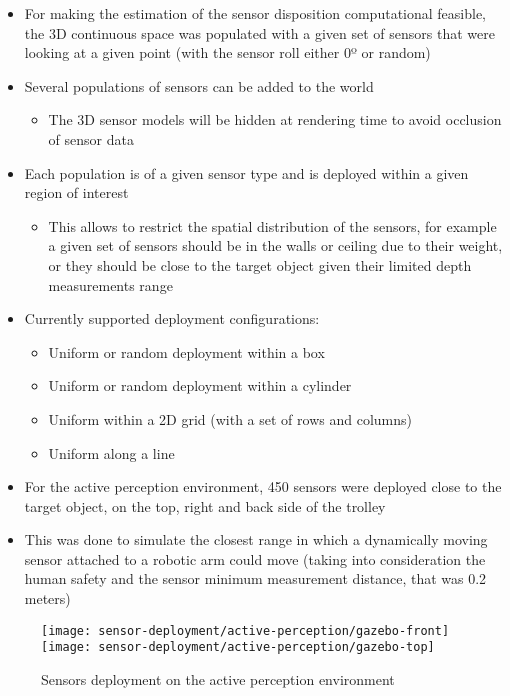 \begin{itemize}
	\item For making the estimation of the sensor disposition computational feasible, the 3D continuous space was populated with a given set of sensors that were looking at a given point (with the sensor roll either 0º or random)
	\item Several populations of sensors can be added to the world
	\begin{itemize}
		\item The 3D sensor models will be hidden at rendering time to avoid occlusion of sensor data
	\end{itemize}
	\item Each population is of a given sensor type and is deployed within a given region of interest 
	\begin{itemize}
		\item This allows to restrict the spatial distribution of the sensors, for example a given set of sensors should be in the walls or ceiling due to their weight, or they should be close to the target object given their limited depth measurements range
	\end{itemize}
	\item Currently supported deployment configurations:
	\begin{itemize}
		\item Uniform or random deployment within a box
		\item Uniform or random deployment within a cylinder
		\item Uniform within a 2D grid (with a set of rows and columns)
		\item Uniform along a line
	\end{itemize}
\end{itemize}

\begin{itemize}
	\item For the active perception environment, 450 sensors were deployed close to the target object, on the top, right and back side of the trolley
	\item This was done to simulate the closest range in which a dynamically moving sensor attached to a robotic arm could move (taking into consideration the human safety and the sensor minimum measurement distance, that was 0.2 meters)
\end{itemize}
\begin{figure}
	\centering
	\texttt{[image: sensor-deployment/active-perception/gazebo-front]}\hspace{1em}
	\texttt{[image: sensor-deployment/active-perception/gazebo-top]}
	\caption{Sensors deployment on the active perception environment}
\end{figure}


